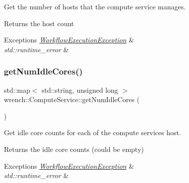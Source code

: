 Get the number of hosts that the compute service manages. 

\begin{DoxyReturn}{Returns}
the host count
\end{DoxyReturn}

\begin{DoxyExceptions}{Exceptions}
{\em \hyperlink{classwrench_1_1_workflow_execution_exception}{Workflow\+Execution\+Exception}} & \\
\hline
{\em std\+::runtime\+\_\+error} & \\
\hline
\end{DoxyExceptions}
\mbox{\label{classwrench_1_1_compute_service_a7d717171627835491772e589c4e6101f}} 
\subsubsection{\texorpdfstring{get\+Num\+Idle\+Cores()}{getNumIdleCores()}}
{\footnotesize\ttfamily std\+::map$<$ std\+::string, unsigned long $>$ wrench\+::\+Compute\+Service\+::get\+Num\+Idle\+Cores (\begin{DoxyParamCaption}{ }\end{DoxyParamCaption})}



Get idle core counts for each of the compute service\textquotesingle{}s host. 

\begin{DoxyReturn}{Returns}
the idle core counts (could be empty)
\end{DoxyReturn}

\begin{DoxyExceptions}{Exceptions}
{\em \hyperlink{classwrench_1_1_workflow_execution_exception}{Workflow\+Execution\+Exception}} & \\
\hline
{\em std\+::runtime\+\_\+error} & \\
\hline
\end{DoxyExceptions}
\mbox{\label{classwrench_1_1_compute_service_a751da474fe424957a614116cef6a5e13}} 
